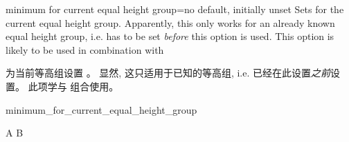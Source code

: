 \begin{docTcbKey}[][doc new=2016-03-24]{minimum for current equal height group}{=}{no default, initially unset}
Sets  for the current equal height
group. Apparently, this only works for an already known equal height group, i.e.
 has to be set \emph{before} this option is used.
This option is likely to be used in combination with 

为当前等高组设置 。
显然, 这只适用于已知的等高组, i.e.
已经在此设置\emph{之前}设置。
此项学与  组合使用。
\begin{exdispExample}[runs=2]{minimum_for_current_equal_height_group}
\begin{tcbitemize}[raster equal height,colframe=blue!75!black,colback=white,
raster every box/.style={minimum for current equal height group=2cm}]
\tcbitem A
\tcbitem B
\end{tcbitemize}
\end{exdispExample}

\end{docTcbKey}




